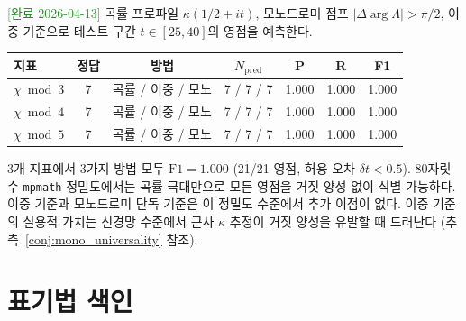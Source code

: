 \documentclass[11pt, a4paper]{article}
\theoremstyle{definition}
\theoremstyle{plain}
\begin{document}
\textcolor{ForestGreen}{[완료 2026-04-13]}
곡률 프로파일 $\kappa(1/2+it)$, 모노드로미 점프 $|\Delta\arg\Lambda|>\pi/2$, 이중 기준으로 테스트 구간 $t\in[25,40]$의 영점을 예측한다.

\begin{center}
\small
\begin{tabular}{lcccccc}
\toprule
\textbf{지표} & \textbf{정답} & \textbf{방법} & $N_{\mathrm{pred}}$ & \textbf{P} & \textbf{R} & \textbf{F1} \\
\midrule
$\chi\bmod 3$ & 7 & 곡률 / 이중 / 모노 & 7 / 7 / 7 & 1.000 & 1.000 & 1.000 \\
$\chi\bmod 4$ & 7 & 곡률 / 이중 / 모노 & 7 / 7 / 7 & 1.000 & 1.000 & 1.000 \\
$\chi\bmod 5$ & 7 & 곡률 / 이중 / 모노 & 7 / 7 / 7 & 1.000 & 1.000 & 1.000 \\
\bottomrule
\end{tabular}
\end{center}

\noindent
3개 지표에서 3가지 방법 모두 $\mathrm{F1}=1.000$ (21/21 영점, 허용 오차 $\delta t < 0.5$). 80자릿수 \texttt{mpmath} 정밀도에서는 곡률 극대만으로 모든 영점을 거짓 양성 없이 식별 가능하다. 이중 기준과 모노드로미 단독 기준은 이 정밀도 수준에서 추가 이점이 없다. 이중 기준의 실용적 가치는 신경망 수준에서 근사 $\kappa$ 추정이 거짓 양성을 유발할 때 드러난다 (추측~\ref{conj:mono_universality} 참조).

\section{표기법 색인}
\label{app:notation}
\end{document}
